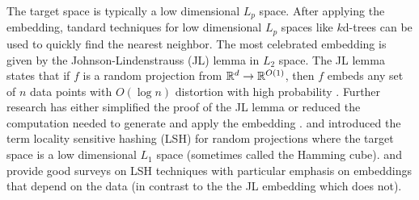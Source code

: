 \documentclass[thesis.tex]{subfiles}
\begin{document}
The target space is typically a low dimensional $L_p$ space.
After applying the embedding,
tandard techniques for low dimensional $L_p$ spaces like $k$d-trees can be used to quickly find the nearest neighbor.
The most celebrated embedding is given by the Johnson-Lindenstrauss (JL) lemma in $L_2$ space.
The JL lemma states that if $f$ is a random projection from $\mathbb R^d \to \mathbb R^{O(1)}$, 
then $f$ embeds any set of $n$ data points with $O(\log n)$ distortion with high probability \citep{johnson1984extensions}.
Further research has either simplified the proof of the JL lemma \citep{dasgupta2003elementary,baraniuk2008simple} or reduced the computation needed to generate and apply the embedding \citep{achlioptas2001database}.
\citet{indyk1998approximate} and \citet{gionis1999similarity} introduced the term locality sensitive hashing (LSH) for random projections where the target space is a low dimensional $L_1$ space 
(sometimes called the Hamming cube). 
\cite{wang2014hashing} and \cite{wang2016learning} provide good surveys on LSH techniques with particular emphasis on embeddings that depend on the data (in contrast to the the JL embedding which does not).
\end{document}
